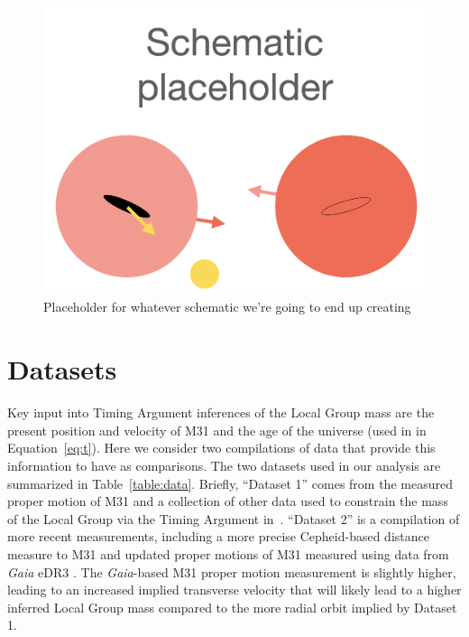 \documentclass[twocolumn]{aastex631}
\begin{document}

\begin{figure}[htb]
  \centering
  \includegraphics[width=0.8\columnwidth]{schematic_placeholder.png}
  \caption{
    Placeholder for whatever schematic we're going to end up creating
  }
  \label{fig:schematic}
\end{figure}


\section{Datasets}
\label{sec:datasets}

Key input into Timing Argument inferences of the Local Group mass are the
present position and velocity of M31 and the age of the universe (used in in
Equation~\ref{eq:t}).
Here we consider two compilations of data that provide this information to have
as comparisons.
The two datasets used in our analysis are summarized in Table~\ref{table:data}.
Briefly, ``Dataset 1'' comes from the measured proper motion of M31 and a
collection of other data used to constrain the mass of the Local Group via the
Timing Argument in~\citet{vdm2012}. 
``Dataset 2'' is a compilation of more recent measurements, including a more
precise Cepheid-based distance measure to M31 \citep{Li2021} and updated proper
motions of M31 measured using data from \textit{Gaia} eDR3 \citep{Salomon2021}.
The \textit{Gaia}-based M31 proper motion measurement is slightly higher,
leading to an increased implied transverse velocity that will likely lead to a
higher inferred Local Group mass compared to the more radial orbit implied by
Dataset 1.
\end{document}
